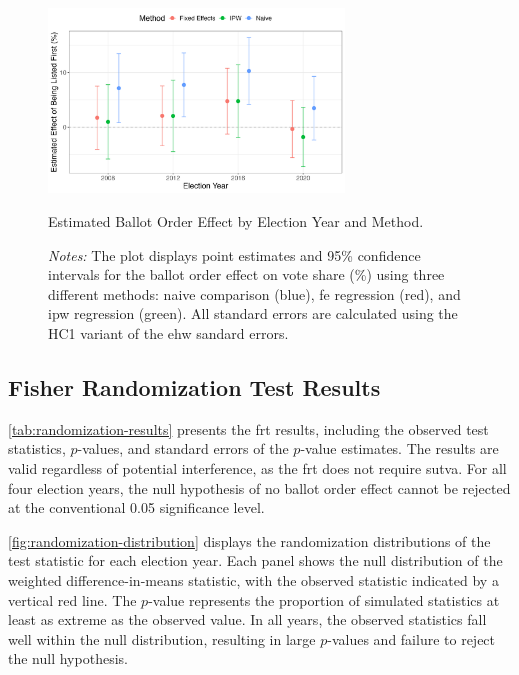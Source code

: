 \documentclass[10pt]{article}
\theoremstyle{sfstyle}
\theoremstyle{remark}
\begin{document}
\begin{figure}[htbp]
  \centering
  \includegraphics[width=0.7\textwidth]{../outputs/figures/effect_plot.png}
  \caption{Estimated Ballot Order Effect by Election Year and Method.}
  \caption*{\textit{Notes:} 
    The plot displays point estimates and 95\% confidence intervals 
    for the ballot order effect on vote share (\%)
    using three different methods: 
    naive comparison (blue), 
    \gls{fe} regression (red),
    and \gls{ipw} regression (green).
    All standard errors are calculated 
    using the HC1 variant of the \gls{ehw} sandard errors.}
  \label{fig:effect-plot}
\end{figure}

\subsection{Fisher Randomization Test Results}

\cref{tab:randomization-results} presents
the \gls{frt} results,
including the observed test statistics,
$p$-values,
and standard errors of the $p$-value estimates.
The results are valid regardless of potential interference,
as the \gls{frt} does not require \gls{sutva}.
For all four election years,
the null hypothesis of no ballot order effect
cannot be rejected at the conventional 0.05 significance level.



\cref{fig:randomization-distribution} displays
the randomization distributions
of the test statistic
for each election year.
Each panel shows the null distribution
of the weighted difference-in-means statistic,
with the observed statistic indicated by a vertical red line.
The $p$-value represents the proportion
of simulated statistics
at least as extreme as the observed value.
In all years,
the observed statistics fall well within
the null distribution,
resulting in large $p$-values
and failure to reject the null hypothesis.
\end{document}
